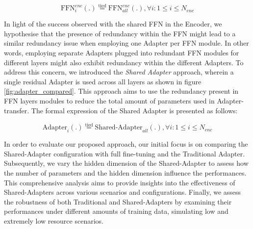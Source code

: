 \begin{equation}
    \text{FFN}_{i}^{enc}(.) \stackrel{\text{tied}}{=} \text{FFN}^{enc}_{all}(.) , \forall i: 1 \leq i \leq N_{enc}
\end{equation}

In light of the success observed with the shared \ac{FFN} in the Encoder, we hypothesise that the presence of redundancy within the \ac{FFN} might lead to a similar redundancy issue when employing one Adapter per \ac{FFN} module. In other words, employing separate Adapters plugged into redundant \ac{FFN} modules for different layers might also exhibit redundancy within the different Adapters. To address this concern, we introduced the \textit{Shared Adapter} approach, wherein a single residual Adapter is used across all layers as shown in figure \ref{fig:adapter_compared}. This approach aims to use the redundancy present in \ac{FFN} layers modules to reduce the total amount of parameters used in Adapter-transfer. The formal expression of the Shared Adapter is presented as follows:

\begin{equation}
    \text{Adapter}_{i}(.) \stackrel{\text{tied}}{=} \text{Shared-Adapter}_{all}(.) , \forall i: 1 \leq i \leq N_{enc}
\end{equation}

In order to evaluate our proposed approach, our initial focus is on comparing the Shared-Adapter configuration with full fine-tuning and the Traditional Adapter. Subsequently, we vary the hidden dimension of the Shared-Adapter to assess how the number of parameters and the hidden dimension influence the performances. This comprehensive analysis aims to provide insights into the effectiveness of Shared-Adapters across various scenarios and configurations. Finally, we assess the robustness of both Traditional and Shared-Adapters by examining their performances under different amounts of training data, simulating low and extremely low resource scenarios.

